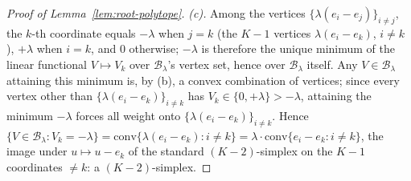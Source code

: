 \documentclass[11pt]{article}
\theoremstyle{plain}
\theoremstyle{definition}
\theoremstyle{remark}
\newcommand{\cB}{\mathcal{B}}
\begin{document}
\begin{proof}[Proof of Lemma~\ref{lem:root-polytope}]
\emph{(c).} Among the vertices $\{\lambda(e_i-e_j)\}_{i\ne j}$, the $k$-th
coordinate equals $-\lambda$ when $j=k$ (the $K-1$ vertices $\lambda(e_i-e_k)$,
$i\ne k$), $+\lambda$ when $i=k$, and $0$ otherwise; $-\lambda$ is therefore the
unique minimum of the linear functional $V\mapsto V_k$ over $\cB_\lambda$'s vertex
set, hence over $\cB_\lambda$ itself. Any $V\in\cB_\lambda$ attaining this minimum
is, by (b), a convex combination of vertices; since every vertex other than
$\{\lambda(e_i-e_k)\}_{i\ne k}$ has $V_k\in\{0,+\lambda\}>-\lambda$, attaining the
minimum $-\lambda$ forces all weight onto $\{\lambda(e_i-e_k)\}_{i\ne k}$. Hence
$\{V\in\cB_\lambda:V_k=-\lambda\}=\mathrm{conv}\{\lambda(e_i-e_k):i\ne
k\}=\lambda\cdot\mathrm{conv}\{e_i-e_k:i\ne k\}$, the image under $u\mapsto u-e_k$
of the standard $(K-2)$-simplex on the $K-1$ coordinates $\ne k$: a
$(K-2)$-simplex.
\end{proof}
\end{document}
